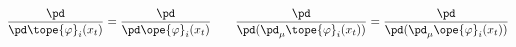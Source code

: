 \begin{equation}	\label{12.66new}
\frac{\pd}{\pd \tope{\varphi}_i(x_t)}
=
\frac{\pd}{\pd \ope{\varphi}_i(x_t)}
\qquad
\frac{\pd}{\pd (\pd_\mu\tope{\varphi}_i(x_t))}
=
\frac{\pd}{\pd (\pd_\mu\ope{\varphi}_i(x_t))}
	\end{equation}

